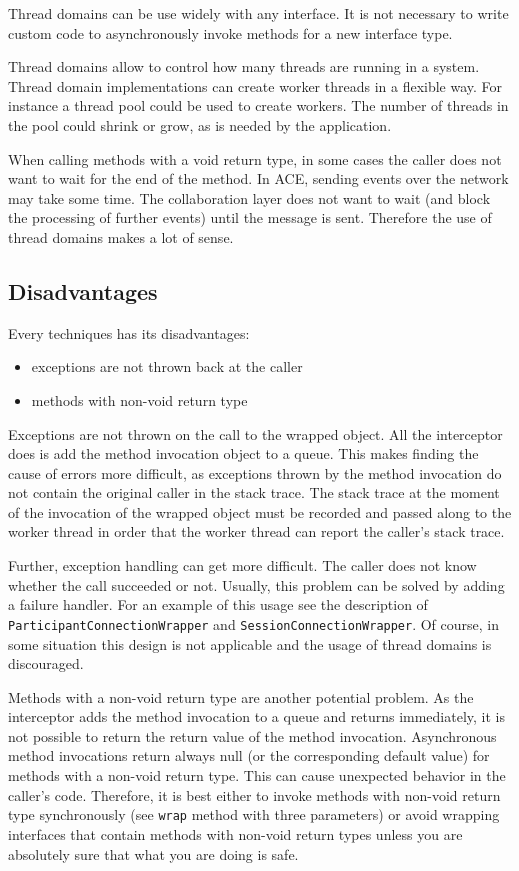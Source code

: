 Thread domains can be use widely with any interface. It is not necessary to
write custom code to asynchronously invoke methods for a new interface type.

Thread domains allow to control how many threads are running in a system.
Thread domain implementations can create worker threads in a flexible way. For
instance a thread pool could be used to create workers. The number of
threads in the pool could shrink or grow, as is needed by the application.

When calling methods with a void return type,
in some cases the caller does not want to wait for the end of the method.
In ACE, sending events over the network may take some time. The collaboration
layer does not want to wait (and block the processing of further events)
until the message is sent. Therefore the use of thread domains makes a
lot of sense.


\subsection{Disadvantages}
Every techniques has its disadvantages:

\begin{itemize}
 \item exceptions are not thrown back at the caller
 \item methods with non-void return type
\end{itemize}

Exceptions are not thrown on the call to the wrapped object. All the 
interceptor does is add the method invocation object to a queue. This makes
finding the cause of errors more difficult, as exceptions thrown by the
method invocation do not contain the original caller in the stack trace.
The stack trace at the moment of the invocation of the wrapped object must
be recorded and passed along to the worker thread in order that the worker
thread can report the caller's stack trace. 

Further, exception handling can get more difficult. The caller does not
know whether the call succeeded or not. Usually, this problem can be solved
by adding a failure handler. For an example of this usage see the
description of \texttt{ParticipantConnectionWrapper} and 
\texttt{SessionConnectionWrapper}. Of course, in some situation this
design is not applicable and the usage of thread domains is discouraged.

Methods with a non-void return type are another potential problem. As the
interceptor adds the method invocation to a queue and returns immediately,
it is not possible to return the return value of the method invocation.
Asynchronous method invocations return always null (or the corresponding
default value) for methods with a non-void return type. This can cause
unexpected behavior in the caller's code. Therefore, it is best either to
invoke methods with non-void return type synchronously (see \texttt{wrap}
method with three parameters) or avoid wrapping interfaces that contain
methods with non-void return types unless you are absolutely sure that
what you are doing is safe.



